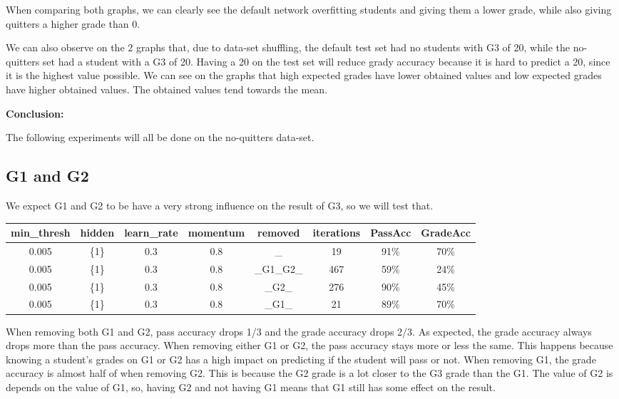 \documentclass[11pt]{article}
\begin{document}
When comparing both graphs, we can clearly see the default network overfitting students and giving them a lower grade, while also giving quitters a higher grade than 0.

\hfill \break
\hfill \break

We can also observe on the 2 graphs that, due to data-set shuffling, the default test set had no students with G3 of 20, while the no-quitters set had a student with a G3 of 20. Having a 20 on the test set will reduce grady accuracy because it is hard to predict a 20, since it is the highest value possible. We can see on the graphs that high expected grades have lower obtained values and low expected grades have higher obtained values. The obtained values tend towards the mean.

\hfill \break
\hfill \break
\textbf{Conclusion:}

The following experiments will all be done on the no-quitters data-set.

\subsection{G1 and G2}
We expect G1 and G2 to be have a very strong influence on the result of G3, so we will test that.
\hfill \break
\hfill \break
\begin{tabular}{| c | c | c | c | c | c | c | c |}
\hline \textbf{min\_thresh} & \textbf{hidden} & \textbf{learn\_rate} & \textbf{momentum} & \textbf{removed} & \textbf{iterations} & \textbf{PassAcc} & \textbf{GradeAcc}\\
\hline 0.005 & \{1\} & 0.3 & 0.8 & \_ & 19 & 91\% & 70\%\\
\hline 0.005 & \{1\} & 0.3 & 0.8 & \_G1\_G2\_ & 467 & 59\% & 24\%\\
\hline 0.005 & \{1\} & 0.3 & 0.8 & \_G2\_ & 276 & 90\% & 45\%\\
\hline 0.005 & \{1\} & 0.3 & 0.8 & \_G1\_ & 21 & 89\% & 70\%\\
\hline
\end{tabular}

When removing both G1 and G2, pass accuracy drops 1/3 and the grade accuracy drops 2/3. As expected, the grade accuracy always drops more than the pass accuracy.
\hfill \break
\hfill \break
When removing either G1 or G2, the pass accuracy stays more or less the same. This happens because knowing a student's grades on G1 or G2 has a high impact on predicting if the student will pass or not.
\hfill \break
\hfill \break
When removing G1, the grade accuracy is almost half of when removing G2. This is because the G2 grade is a lot closer to the G3 grade than the G1. The value of G2 is depends on the value of G1, so, having G2 and not having G1 means that G1 still has some effect on the result.
\end{document}
